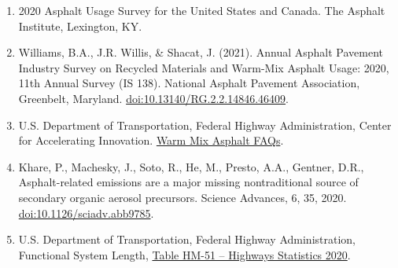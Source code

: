 \documentclass[
  11pt,
  oneside]{book}
\providecommand{\tightlist}{%
  \setlength{\itemsep}{0pt}\setlength{\parskip}{0pt}}
\begin{document}
\begin{enumerate}
\def\labelenumi{\arabic{enumi}.}
\tightlist
\item
  2020 Asphalt Usage Survey for the United States and Canada. The Asphalt Institute, Lexington, KY.
\item
  Williams, B.A., J.R. Willis, \& Shacat, J. (2021). Annual Asphalt Pavement Industry Survey on Recycled Materials and Warm-Mix Asphalt Usage: 2020, 11th Annual Survey (IS 138). National Asphalt Pavement Association, Greenbelt, Maryland. \url{doi:10.13140/RG.2.2.14846.46409}.
\item
  U.S. Department of Transportation, Federal Highway Administration, Center for Accelerating Innovation. \href{https://www.fhwa.dot.gov/innovation/everydaycounts/edc-1/wma-faqs.cfm\#hot}{Warm Mix Asphalt FAQs}.
\item
  Khare, P., Machesky, J., Soto, R., He, M., Presto, A.A., Gentner, D.R., Asphalt-related emissions are a major missing nontraditional source of secondary organic aerosol precursors. Science Advances, 6, 35, 2020. \url{doi:10.1126/sciadv.abb9785}.
\item
  U.S. Department of Transportation, Federal Highway Administration, Functional System Length, \href{https://www.fhwa.dot.gov/policyinformation/statistics/2020/hm51.cfm}{Table HM-51 -- Highways Statistics 2020}.
\end{enumerate}
\end{document}
